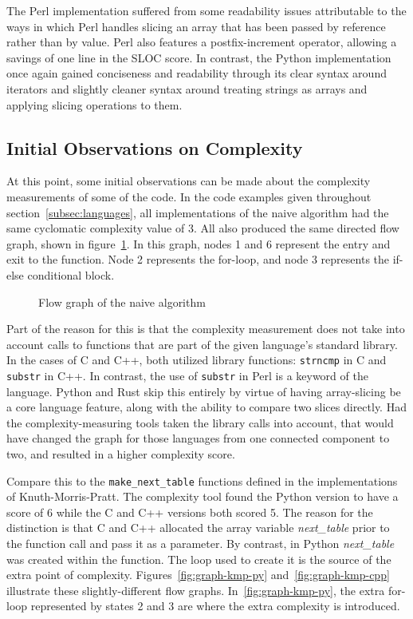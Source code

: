 The Perl implementation suffered from some readability issues attributable to the ways in which Perl handles slicing an array that has been passed by reference rather than by value. Perl also features a postfix-increment operator, allowing a savings of one line in the SLOC score. In contrast, the Python implementation once again gained conciseness and readability through its clear syntax around iterators and slightly cleaner syntax around treating strings as arrays and applying slicing operations to them.

\subsection{Initial Observations on Complexity}

At this point, some initial observations can be made about the complexity measurements of some of the code. In the code examples given throughout section~\ref{subsec:languages}, all implementations of the naive algorithm had the same cyclomatic complexity value of 3. All also produced the same directed flow graph, shown in figure~\ref{fig:graph-naive}. In this graph, nodes 1 and 6 represent the entry and exit to the function. Node 2 represents the for-loop, and node 3 represents the if-else conditional block.

\begin{figure}[ht]
\centering

\caption{Flow graph of the naive algorithm}
\label{fig:graph-naive}
\end{figure}

Part of the reason for this is that the complexity measurement does not take into account calls to functions that are part of the given language's standard library. In the cases of C and C++, both utilized library functions: \texttt{strncmp} in C and \texttt{substr} in C++. In contrast, the use of \texttt{substr} in Perl is a keyword of the language. Python and Rust skip this entirely by virtue of having array-slicing be a core language feature, along with the ability to compare two slices directly. Had the complexity-measuring tools taken the library calls into account, that would have changed the graph for those languages from one connected component to two, and resulted in a higher complexity score.

Compare this to the \texttt{make\_next\_table} functions defined in the implementations of Knuth-Morris-Pratt. The complexity tool found the Python version to have a score of 6 while the C and C++ versions both scored 5. The reason for the distinction is that C and C++ allocated the array variable \textit{next\_table} prior to the function call and pass it as a parameter. By contrast, in Python \textit{next\_table} was created within the function. The loop used to create it is the source of the extra point of complexity. Figures~\ref{fig:graph-kmp-py} and~\ref{fig:graph-kmp-cpp} illustrate these slightly-different flow graphs. In~\ref{fig:graph-kmp-py}, the extra for-loop represented by states 2 and 3 are where the extra complexity is introduced.

